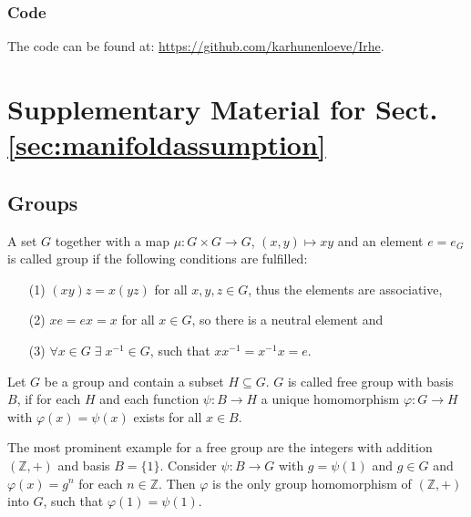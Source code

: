 \documentclass[envcountsect,runningheads]{llncs}
\begin{document}
\subsubsection*{Code} The code can be found at: \href{https://github.com/karhunenloeve/Irhe}{https://github.com/karhunenloeve/Irhe}.
%
%
%
%
%
%
%
\newpage
\appendix
\section{Supplementary Material for Sect. \ref{sec:manifoldassumption}}
\label{a:mannilliegroup}
\subsection{Groups}
\label{a:groups}
\begin{definition}
A set $G$ together with a map $\mu: G \times G \rightarrow G$, $(x,y) \mapsto xy$ and an element $e = e_G$ is called group if the following conditions are fulfilled:
\begin{enumerate}
	\item[(1)] $(xy)z = x(yz)$ for all $x,y,z \in G$, thus the elements are associative,
	\item[(2)] $xe = ex = x$ for all $x \in G$, so there is a neutral element and
	\item[(3)] $\forall x \in G \; \exists \; x^{-1} \in G$, such that $xx^{-1} = x^{-1}x = e$. 
\end{enumerate}
\end{definition}

\begin{definition}{\cite[p.~196]{hilton2012course}}
Let $G$ be a group and contain a subset $H \subseteq G$. $G$ is called free group with basis $B$, if for each $H$ and each function $\psi: B \rightarrow H$ a unique homomorphism $\varphi: G \rightarrow H$ with $\varphi(x) = \psi(x)$ exists for all $x \in B$.
\end{definition}

\begin{example}
The most prominent example for a free group are the integers with addition $(\mathbb{Z},+)$ and basis $B = \{1\}$. Consider $\psi: B \rightarrow G$ with $g = \psi(1)$ and $g \in G$ and $\varphi(x) = g^n$ for each $n \in \mathbb{Z}$. Then $\varphi$ is the only group homomorphism of $(\mathbb{Z},+)$ into $G$, such that $\varphi(1)=\psi(1)$.
\end{example}
\end{document}

